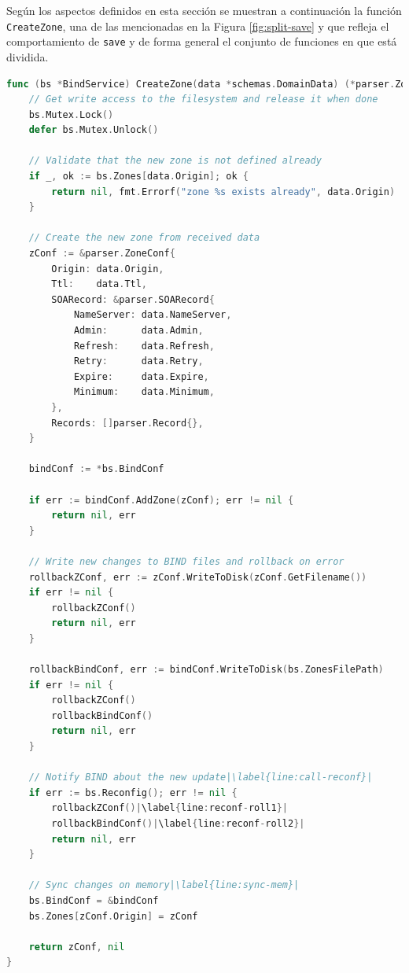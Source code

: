 Según los aspectos definidos en esta sección se muestran a continuación la función \verb|CreateZone|, una de las mencionadas en la Figura \ref{fig:split-save} y que refleja el comportamiento de \verb|save| y de forma general el conjunto de funciones en que está dividida.

\label{func:create-zone}
\begin{lstlisting}[frame=single, language=Go, escapechar=|, caption=Ejemplo de la función que añade una nueva zona al servidor DNS.]
func (bs *BindService) CreateZone(data *schemas.DomainData) (*parser.ZoneConf, error) {
    // Get write access to the filesystem and release it when done
    bs.Mutex.Lock()
    defer bs.Mutex.Unlock()

    // Validate that the new zone is not defined already 
    if _, ok := bs.Zones[data.Origin]; ok {
        return nil, fmt.Errorf("zone %s exists already", data.Origin)
    }

    // Create the new zone from received data
    zConf := &parser.ZoneConf{
        Origin: data.Origin,
        Ttl:    data.Ttl,
        SOARecord: &parser.SOARecord{
            NameServer: data.NameServer,
            Admin:      data.Admin,
            Refresh:    data.Refresh,
            Retry:      data.Retry,
            Expire:     data.Expire,
            Minimum:    data.Minimum,
        },
        Records: []parser.Record{},
    }

	bindConf := *bs.BindConf

	if err := bindConf.AddZone(zConf); err != nil {
		return nil, err
	}

    // Write new changes to BIND files and rollback on error
	rollbackZConf, err := zConf.WriteToDisk(zConf.GetFilename())
	if err != nil {
		rollbackZConf()
		return nil, err
	}

	rollbackBindConf, err := bindConf.WriteToDisk(bs.ZonesFilePath)
	if err != nil {
		rollbackZConf()
		rollbackBindConf()
		return nil, err
	}

    // Notify BIND about the new update|\label{line:call-reconf}|
	if err := bs.Reconfig(); err != nil {
		rollbackZConf()|\label{line:reconf-roll1}|
		rollbackBindConf()|\label{line:reconf-roll2}|
		return nil, err
	}

    // Sync changes on memory|\label{line:sync-mem}|
	bs.BindConf = &bindConf
	bs.Zones[zConf.Origin] = zConf

	return zConf, nil
}
\end{lstlisting}

